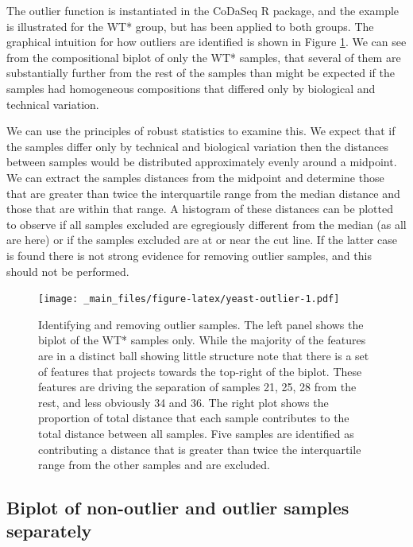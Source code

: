 \documentclass[onecolumn]{article}
\begin{document}
The outlier function is instantiated in the CoDaSeq R package, and the example is illustrated for the WT* group, but has been applied to both groups. The graphical intuition for how outliers are identified is shown in Figure \ref{fig:yeast-outlier}. We can see from the compositional biplot of only the WT* samples, that several of them are substantially further from the rest of the samples than might be expected if the samples had homogeneous compositions that differed only by biological and technical variation.

We can use the principles of robust statistics to examine this. We expect that if the samples differ only by technical and biological variation then the distances between samples would be distributed approximately evenly around a midpoint. We can extract the samples distances from the midpoint and determine those that are greater than twice the interquartile range from the median distance and those that are within that range. A histogram of these distances can be plotted to observe if all samples excluded are egregiously different from the median (as all are here) or if the samples excluded are at or near the cut line. If the latter case is found there is not strong evidence for removing outlier samples, and this should not be performed.

\begin{figure}
\centering
\texttt{[image: \_main\_files/figure-latex/yeast-outlier-1.pdf]}
\caption{\label{fig:yeast-outlier}Identifying and removing outlier samples. The left panel shows the biplot of the WT* samples only. While the majority of the features are in a distinct ball showing little structure note that there is a set of features that projects towards the top-right of the biplot. These features are driving the separation of samples 21, 25, 28 from the rest, and less obviously 34 and 36. The right plot shows the proportion of total distance that each sample contributes to the total distance between all samples. Five samples are identified as contributing a distance that is greater than twice the interquartile range from the other samples and are excluded.}
\end{figure}

\hypertarget{biplot-of-non-outlier-and-outlier-samples-separately}{%
\subsection{Biplot of non-outlier and outlier samples separately}\label{biplot-of-non-outlier-and-outlier-samples-separately}}
\end{document}
